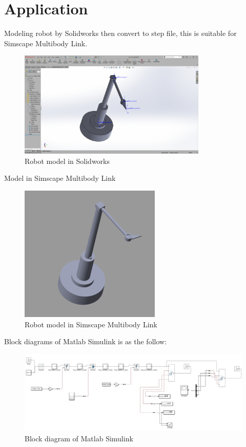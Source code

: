         
    \section{Application}
    Modeling robot by Solidworks then convert to step file, this is suitable for Simscape 
    Multibody Link.
    \begin{figure}[H]
        \centering
        \includegraphics[width=0.8\textwidth]{pictures/solid.png}
        \caption{Robot model in Solidworks}
        \label{fig:robot_model}
    \end{figure}
    \cleardoublepage
    Model in Simscape Multibody Link
    \begin{figure}[H]
        \centering
        \includegraphics[width=0.6\textwidth]{pictures/simscape.png}
        \caption{Robot model in Simscape Multibody Link}
        \label{fig:simscape_model}
    \end{figure}
    Block diagrams of Matlab Simulink is as the follow:
    \begin{figure}[H]
        \centering
        \includegraphics[width=1\textwidth]{pictures/simulink.png}
        \caption{Block diagram of Matlab Simulink}
        \label{fig:simulink_block_diagram}
    \end{figure}
    
